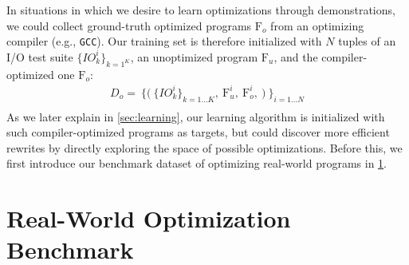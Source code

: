 \documentclass{article}
\newcommand\p{\ensuremath{{\mathrm{F}_u}}}
\newcommand\popt{\ensuremath{{\mathrm{F}_o}}}
\begin{document}
In situations in which we desire to learn optimizations through demonstrations, we could collect ground-truth optimized programs $\popt$ from an optimizing compiler (e.g., \texttt{GCC}).
Our training set is therefore initialized with $N$ tuples of an I/O test suite $\{IO_k^i\}_{k=1^K}$, an unoptimized program $\p$, and the compiler-optimized one $\popt$:
\begin{equation} 
    \begin{split}
    \label{eqn:init_dataset}
        D_o = \
                \bigg\{
                    \Big( \
                        \{IO_k^i\}_{k=1...K}, \
                        \textrm{F}_{u}^i, \
                        \textrm{F}_{o}^i, \
                    \Big) \
                \bigg\}_{i = 1...N} \\
    \end{split}
\end{equation}
As we later explain in \cref{sec:learning}, our learning algorithm is initialized with such  compiler-optimized programs as targets, but could discover more efficient rewrites by directly exploring the space of possible optimizations.
Before this, we first introduce our benchmark dataset of optimizing real-world programs in \cref{sec:benchmark}.



\section{Real-World Optimization Benchmark}
\label{sec:benchmark}
\end{document}
